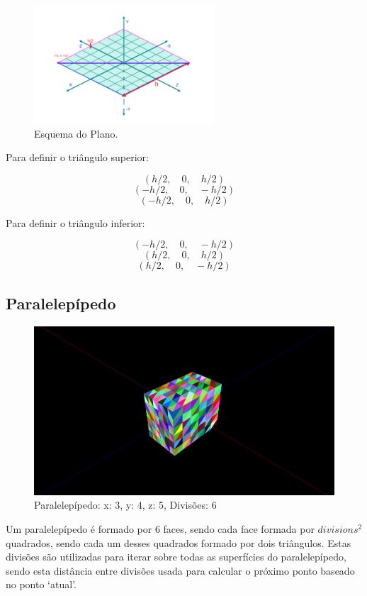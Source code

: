 \documentclass[a4paper]{article}
\begin{document}
\begin{figure}[H]
    \centering
    \includegraphics[width=0.6\textwidth]{esquemaPlano.PNG}
    \caption{Esquema do Plano.}
\end{figure}

Para definir o triângulo superior:

\[(h/2,\quad 0, \quad h/2)\]
\[(-h/2,\quad  0, \quad -h/2)\]
\[(-h/2,\quad  0, \quad h/2)\]

Para definir o triângulo inferior:

\[(-h/2, \quad 0, \quad -h/2)\]
\[(h/2, \quad  0, \quad  h/2)\]
\[(h/2, \quad  0, \quad -h/2)\]

\subsection{Paralelepípedo}
\begin{figure}[H]
    \centering
    \includegraphics[width=\textwidth]{box.png}
    \caption{Paralelepípedo: x: 3, y: 4, z: 5, Divisões: 6}
\end{figure}

Um paralelepípedo é formado por 6 faces, sendo cada face formada por $divisions^2$ quadrados, sendo cada um desses quadrados formado por dois triângulos. Estas divisões são utilizadas para iterar sobre todas as superfícies do paralelepípedo, sendo esta distância entre divisões usada para calcular o próximo ponto baseado no ponto `atual'.
\end{document}
